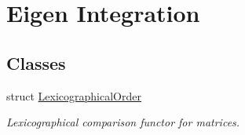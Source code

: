 \hypertarget{group___eigen_typedefs}{\section{Eigen Integration}
\label{group___eigen_typedefs}
}
\subsection*{Classes}
\begin{DoxyCompactItemize}
\item 
struct \hyperlink{struct_d_o_1_1_lexicographical_order}{Lexicographical\-Order}
\begin{DoxyCompactList}\small\item\em Lexicographical comparison functor for matrices. \end{DoxyCompactList}\end{DoxyCompactItemize}
